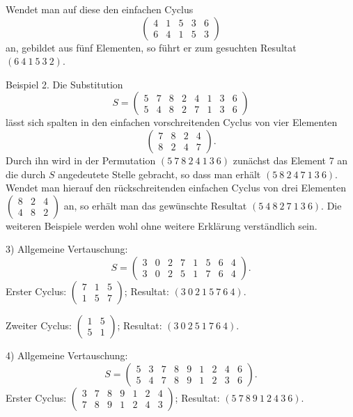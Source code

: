 \documentclass[10pt]{article}
\begin{document}
Wendet man auf diese den einfachen Cyclus
\[
\begin{pmatrix}4&1&5&3&6\\6&4&1&5&3\end{pmatrix}
\]
an, gebildet aus fünf Elementen, so führt er zum gesuchten Resultat \((6\ 4\ 1\ 5\ 3\ 2)\).

Beispiel 2. Die Substitution
\[
S=\begin{pmatrix}5&7&8&2&4&1&3&6\\5&4&8&2&7&1&3&6\end{pmatrix}
\]
lässt sich spalten in den einfachen vorschreitenden Cyclus von vier Elementen
\[
\begin{pmatrix}7&8&2&4\\8&2&4&7\end{pmatrix}.
\]
Durch ihn wird in der Permutation \((5\ 7\ 8\ 2\ 4\ 1\ 3\ 6)\) zunächst das Element 7 an die durch \(S\) angedeutete Stelle gebracht, so dass man erhält \((5\ 8\ 2\ 4\ 7\ 1\ 3\ 6)\). Wendet man hierauf den rückschreitenden einfachen Cyclus von drei Elementen \(\begin{pmatrix}8&2&4\\4&8&2\end{pmatrix}\) an, so erhält man das gewünschte Resultat \((5\ 4\ 8\ 2\ 7\ 1\ 3\ 6)\). Die weiteren Beispiele werden wohl ohne weitere Erklärung verständlich sein.

3) Allgemeine Vertauschung:
\[
S=\begin{pmatrix}3&0&2&7&1&5&6&4\\3&0&2&5&1&7&6&4\end{pmatrix}.
\]
Erster Cyclus: \(\begin{pmatrix}7&1&5\\1&5&7\end{pmatrix}\); Resultat: \((3\ 0\ 2\ 1\ 5\ 7\ 6\ 4)\).

Zweiter Cyclus: \(\begin{pmatrix}1&5\\5&1\end{pmatrix}\); Resultat: \((3\ 0\ 2\ 5\ 1\ 7\ 6\ 4)\).

4) Allgemeine Vertauschung:
\[
S=\begin{pmatrix}5&3&7&8&9&1&2&4&6\\5&4&7&8&9&1&2&3&6\end{pmatrix}.
\]
Erster Cyclus: \(\begin{pmatrix}3&7&8&9&1&2&4\\7&8&9&1&2&4&3\end{pmatrix}\); Resultat: \((5\ 7\ 8\ 9\ 1\ 2\ 4\ 3\ 6)\).
\end{document}
